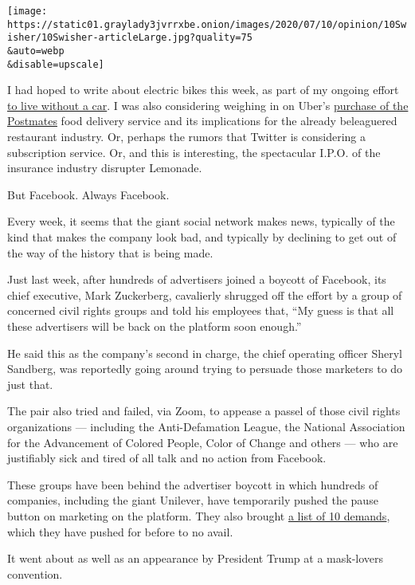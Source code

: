 \texttt{[image: https://static01.graylady3jvrrxbe.onion/images/2020/07/10/opinion/10Swisher/10Swisher-articleLarge.jpg?quality=75\\\&auto=webp\\\&disable=upscale]}

I had hoped to write about electric bikes this week, as part of my
ongoing effort
\href{https://www.nytimes3xbfgragh.onion/2020/07/09/opinion/ban-cars-manhattan-cities.html}{to
live without a car}. I was also considering weighing in on Uber's
\href{https://www.nytimes3xbfgragh.onion/2020/07/05/technology/uber-postmates-deal.html?searchResultPosition=1}{purchase
of the Postmates} food delivery service and its implications for the
already beleaguered restaurant industry. Or, perhaps the rumors that
Twitter is considering a subscription service. Or, and this is
interesting, the spectacular I.P.O. of the insurance industry disrupter
Lemonade.

But Facebook. Always Facebook.

Every week, it seems that the giant social network makes news, typically
of the kind that makes the company look bad, and typically by declining
to get out of the way of the history that is being made.

Just last week, after hundreds of advertisers joined a boycott of
Facebook, its chief executive, Mark Zuckerberg, cavalierly shrugged off
the effort by a group of concerned civil rights groups and told his
employees that, ``My guess is that all these advertisers will be back on
the platform soon enough.''

He said this as the company's second in charge, the chief operating
officer Sheryl Sandberg, was reportedly going around trying to persuade
those marketers to do just that.

The pair also tried and failed, via Zoom, to appease a passel of those
civil rights organizations --- including the Anti-Defamation League, the
National Association for the Advancement of Colored People, Color of
Change and others --- who are justifiably sick and tired of all talk and
no action from Facebook.

These groups have been behind the advertiser boycott in which hundreds
of companies, including the giant Unilever, have temporarily pushed the
pause button on marketing on the platform. They also brought
\href{https://www.nytimes3xbfgragh.onion/2020/07/07/technology/facebook-ad-boycott-civil-rights.html}{a
list of 10 demands}, which they have pushed for before to no avail.

It went about as well as an appearance by President Trump at a
mask-lovers convention.

